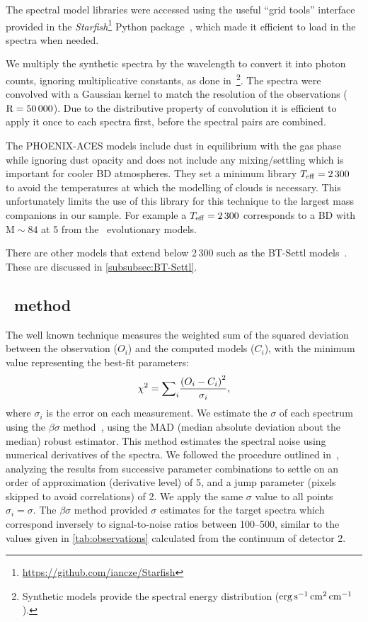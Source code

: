 

The spectral model libraries were accessed using the useful ``grid tools'' interface provided in the \emph{Starfish}\footnote{\url{https://github.com/iancze/Starfish}} Python package~\citep{czekala_constructing_2015}, which made it efficient to load in the spectra when needed.

We multiply the synthetic spectra by the wavelength to convert it into photon counts, ignoring multiplicative constants, as done in~\citet{figueira_radial_2016}\footnote{Synthetic models provide the spectral energy distribution (\(\rm erg\,s^{-1}\,cm^{2}\,cm^{-1}\)).}.
The spectra were convolved with a Gaussian kernel to match the resolution of the observations (\(\rm R=50\,000\)).
Due to the distributive property of convolution it is efficient to apply it once to each spectra first, before the spectral pairs are combined.

The {PHOENIX-ACES} models include dust in equilibrium with the gas phase while ignoring dust opacity and does not include any mixing/settling which is important for cooler {BD} atmospheres.
They set a minimum library \(T_{\mathrm{eff}}{}=2\,300\)\K{} to avoid the temperatures at which the modelling of clouds is necessary.
This unfortunately limits the use of this library for this technique to the largest mass companions in our sample.
For example a \(T_{\mathrm{eff}}{}=2\,300\)\K{} corresponds to a {BD} with \(\textrm{M}\sim84\)\Mjup{} at 5\Gyr{} from the~\citet{baraffe_evolutionary_2003} evolutionary models.

There are other models that extend below 2\,300\K{} such as the {BT-Settl} models~\citep{allard_btsettl_2013,baraffe_new_2015}.
These are discussed in \cref{subsubsec:BT-Settl}.


\subsection{\texorpdfstring{\textchisquared}\ \ method}
\label{subsec:chi2}
The well known \textchisquared{} technique measures the weighted sum of the squared deviation between the observation (\({O}_{i}\)) and the computed models (\(C_{i}\)), with the minimum \textchisquared{} value representing the best-fit parameters:
\[{\chi}^{2} = {\sum}_i \frac{{(O_{i} - C_{i})}^2}{{\sigma}_{i}},\] where \({\sigma}_{i}\) is the error on each measurement.
We estimate the \(\sigma\) of each spectrum using the \(\beta\sigma\) method~\citep{czesla_posteriori_2018}, using the MAD (median absolute deviation about the median) robust estimator. {\red{} This method estimates the spectral noise using numerical derivatives of the spectra.
We followed the procedure outlined in~\citet{czesla_posteriori_2018}, analyzing the results from successive parameter combinations to settle on an order of approximation (derivative level) of 5, and a jump parameter (pixels skipped to avoid correlations) of 2.} We apply the same \(\sigma\) value to all points \({\sigma}_{i} = \sigma\).
The \(\beta\sigma\) method provided \(\sigma\) estimates for the target spectra which correspond inversely to signal-to-noise ratios between 100--500, {\red{} similar to the values given in \cref{tab:observations} calculated from the continuum of detector 2.}

